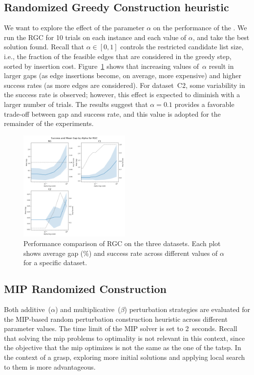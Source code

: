 \documentclass[twocolumn, switch]{article} %
\begin{document}
\subsection{Randomized Greedy Construction heuristic}
We want to explore the effect of the parameter $\alpha$ on the performance of the .
We run the RGC for 10 trials on each instance and each value of $\alpha$, and take the best solution found.
Recall that $\alpha \in [0, 1]$ controls the restricted candidate list size, i.e., the fraction of the feasible edges that are considered in the greedy step, sorted by insertion cost.
Figure~\ref{fig:alpha_vs_mean_gap_randomized_greedy} shows that increasing values of~$\alpha$ result in larger gaps (as edge insertions become, on average, more expensive) and higher success rates (as more edges are considered). For dataset~C2, some variability in the success rate is observed; however, this effect is expected to diminish with a larger number of trials. The results suggest that $\alpha = 0.1$ provides a favorable trade-off between gap and success rate, and this value is adopted for the remainder of the experiments.

\begin{figure}[h]
    \centering
    \includegraphics[width=0.49\textwidth]{figures/alpha_vs_mean_gap_randomized_greedy.png}
    \caption{Performance comparison of RGC on the three datasets. Each plot shows average gap (\%) and success rate across different values of $\alpha$ for a specific dataset.}
    \label{fig:alpha_vs_mean_gap_randomized_greedy}
\end{figure}


\subsection{MIP Randomized Construction}

Both additive~($\alpha$) and multiplicative~($\beta$) perturbation strategies are evaluated for the MIP-based random perturbation construction heuristic across different parameter values. The time limit of the MIP solver is set to 2~seconds.
Recall that solving the \gls{mip} problems to optimality is not relevant in this context, since the objective that the \gls{mip} optimizes is not
the same as the one of the \gls{tatsp}. In the context of a \gls{grasp}, exploring more initial solutions and applying local search to them is more advantageous.
\end{document}
